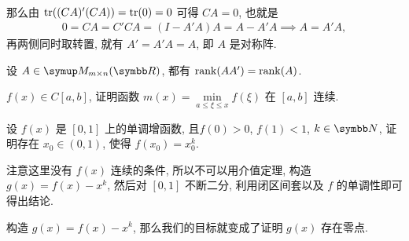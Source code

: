 \begin{exercise}[series=exer]
\begin{answer}
\begin{align*}
        \end{align*}
        那么由 $ \tr((CA)'(CA)) = \tr(0) = 0 $ 可得 $ CA = 0 $, 也就是
        \begin{align*}
            0 = CA = C'CA = (I - A'A)A = A - A'A \implies A = A'A,
        \end{align*}
        再两侧同时取转置, 就有 $ A' = A'A = A $, 即 $ A $ 是对称阵.
    \end{answer}  
    \item 设 $ A \in \MM[\R][m \times n] $, 都有 $ \rank(AA') = \rank(A) $.  
    \item $ f(x) \in C[a, b] $, 证明函数 $ m(x) = \min\limits_{a \le \xi \le x}f(\xi) $ 在 $ [a, b] $ 连续.
    \item 设 $ f(x) $ 是 $ [0, 1] $ 上的单调增函数, 且$ f(0) > 0 $, $ f(1) < 1 $, $ k \in \N $, 证明存在 $ x_{0} \in (0, 1) $, 使得 $ f(x_{0}) = x_{0}^{k} $. 
    \begin{hint}
        注意这里没有 $ f(x) $ 连续的条件, 所以不可以用介值定理, 构造 $ g(x) = f(x) - x^{k} $, 然后对 $ [0, 1] $ 不断二分, 利用闭区间套以及 $ f $ 的单调性即可得出结论.
    \end{hint}
    \begin{answer}
        构造 $ g(x) = f(x) - x^{k} $, 那么我们的目标就变成了证明 $ g(x) $ 存在零点. 


\end{answer}
\end{exercise}
